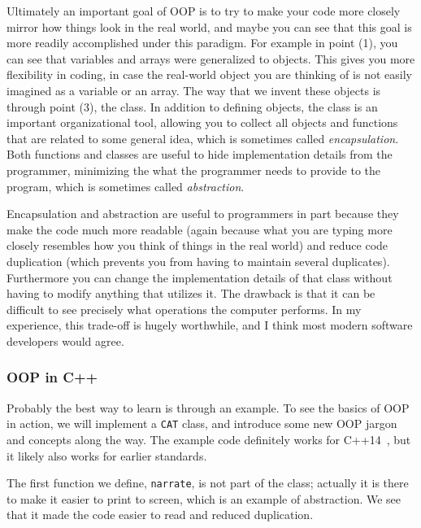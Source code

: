 Ultimately an important goal of OOP is to try to make your code more closely
mirror how things look in the real world, and maybe you can see that this
goal is more readily accomplished under this paradigm.
For example in point (1), you can see that variables
and arrays were generalized to objects. This gives you more flexibility in
coding, in case the real-world object you are thinking of is not easily
imagined as a variable or an array. The way that we invent these objects
is through point (3), the class. In addition to defining objects, the
class is an important organizational tool, allowing you to collect all
objects and functions that are related to some general idea,
which is sometimes called 
{\it encapsulation}. Both functions and classes
are useful to hide implementation details from the programmer, minimizing
the what the programmer needs to provide to the program, which is
sometimes called {\it abstraction}.

Encapsulation and abstraction are useful to programmers in part because
they make the code much more readable (again because what you are typing
more closely resembles how you think of things in the real world) and
reduce code duplication (which prevents you from having to maintain
several duplicates). Furthermore you
can change the implementation details of that class
without having to modify anything that utilizes it. The drawback is that
it can be difficult to see precisely what operations the computer
performs. In my experience, this trade-off is hugely worthwhile, and I think
most modern software developers would agree.

\subsubsection{OOP in C++} 
Probably the best way to learn is through an example. To see the basics
of OOP in action, we will implement a \texttt{CAT} class, and 
introduce some new OOP jargon and concepts along the way.
The example code definitely works for C++14~\cite{cppDocumentation},
but it likely also works for earlier standards.

The first function we define, \texttt{narrate}, is not part of the class;
actually it is there to make it easier to print to screen, which is
an example of abstraction. We see that it made the code easier to
read and reduced duplication.\\



